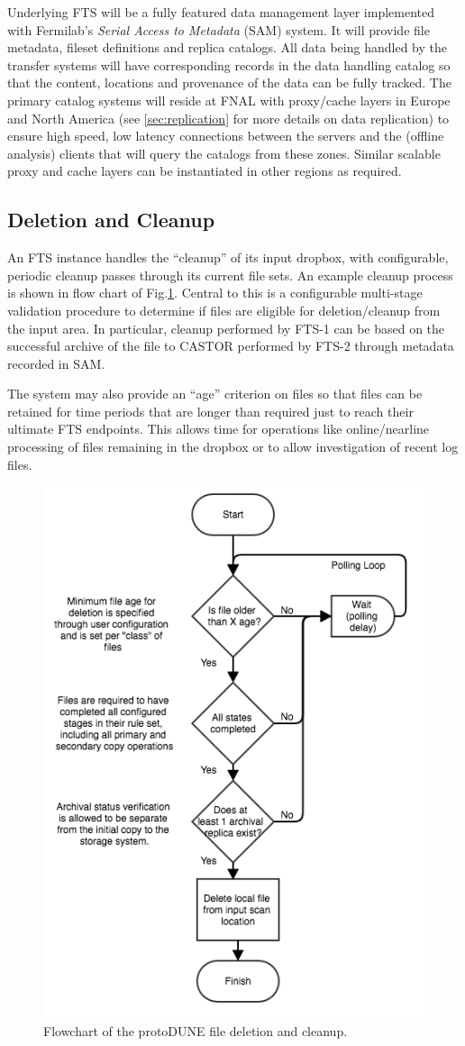 \documentclass[12pt]{article}
\newcommand{\pd}{protoDUNE\xspace}
\begin{document}
Underlying FTS will be a fully featured data management layer
implemented with Fermilab's \textit{Serial Access to Metadata} (SAM) system.
It will provide file metadata, fileset definitions and replica
catalogs.  All data being handled by the transfer systems will have
corresponding records in the data handling catalog so that the
content, locations and provenance of the data can be fully tracked.
The primary catalog systems will reside at FNAL with proxy/cache
layers in Europe and North America (see \ref{sec:replication}
for more details on data replication) to ensure high speed,
low latency connections between the servers and the (offline analysis)
clients that will query the catalogs from these zones.  Similar
scalable proxy and cache layers can be instantiated in other regions as required.

\subsection{Deletion and Cleanup}
\label{sec:cleanup}

An FTS instance handles the ``cleanup'' of its input dropbox, with
configurable, periodic cleanup passes through its current file sets.
An example cleanup process is shown in flow chart of
Fig.\ref{fig:ftscleanup}.  Central to this is a configurable
multi-stage validation procedure to determine if files are eligible
for deletion/cleanup from the input area.  In particular, cleanup
performed by FTS-1 can be based on the successful archive of the file
to CASTOR performed by FTS-2 through metadata recorded in SAM.

The system may also provide an ``age'' criterion on files so that
files can be retained for time periods that are longer than required
just to reach their ultimate FTS endpoints.  This allows time for
operations like online/nearline processing of files remaining in the
dropbox or to allow investigation of recent log files.


\begin{figure}[tbh]
  \centering
  \includegraphics[width=0.55\linewidth]{figures/fts_file_deletion_flowchart.png}  
  \caption{Flowchart of the \pd file deletion and cleanup.}
  \label{fig:ftscleanup}
\end{figure}
\end{document}

